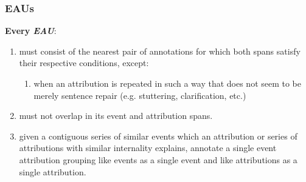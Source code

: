\documentclass[a4paper,12pt]{article}
\begin{document}
    \subsubsection{EAUs}
    \textbf{Every \emph{EAU}}:
        \begin{enumerate}
            \item must consist of the nearest pair of annotations for which both spans satisfy their respective conditions, except:
                \begin{enumerate}
                    \item when an attribution is repeated in such a way that does not seem to be merely sentence repair (e.g. stuttering, clarification, etc.)
                \end{enumerate}
            \item must not overlap in its event and attribution spans.
            \item given a contiguous series of similar events which an attribution or series of attributions with similar internality explains, annotate a single event attribution grouping like events as a single event and like attributions as a single attribution.
        \end{enumerate}
\end{document}
